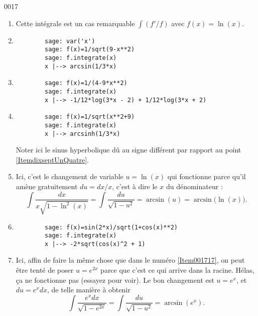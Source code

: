 \begin{corrige}{0017}
\begin{enumerate}
\item
Cette intégrale est un cas remarquable $\int (f'/f)$ avec $f(x)=\ln(x)$.

\item\label{ItemdixseptUnQuatre}
	
	\begin{verbatim}
		sage: var('x')
		sage: f(x)=1/sqrt(9-x**2)
		sage: f.integrate(x)
		x |--> arcsin(1/3*x)
	\end{verbatim}


\item
	\begin{verbatim}
		sage: f(x)=1/(4-9*x**2)
		sage: f.integrate(x)   
		x |--> -1/12*log(3*x - 2) + 1/12*log(3*x + 2)
	\end{verbatim}
\item

	\begin{verbatim}
		sage: f(x)=1/sqrt(x**2+9)
		sage: f.integrate(x)     
		x |--> arcsinh(1/3*x)
	\end{verbatim}
	Noter ici le sinus hyperbolique dû au signe différent par rapport au point \ref{ItemdixseptUnQuatre}.
\item\label{Item001717}
Ici, c'est le changement de variable $u=\ln(x)$ qui fonctionne parce qu'il amène gratuitement $du=dx/x$, c'est à dire le $x$ du dénominateur :
\begin{equation}
	\int\frac{ dx }{ x\sqrt{1-\ln^2(x)} }=\int\frac{ du }{ \sqrt{1-u^2} }=\arcsin(u)=\arcsin\big( \ln(x) \big).
\end{equation}

\item

	\begin{verbatim}
		sage: f(x)=sin(2*x)/sqrt(1+cos(x)**2)
		sage: f.integrate(x)                 
		x |--> -2*sqrt(cos(x)^2 + 1)
	\end{verbatim}
	

\item
Ici, affin de faire la même chose que dans le numéro \ref{Item001717}, on peut être tenté de poser $u= e^{2x}$ parce que c'est ce qui arrive dans la racine. Hélas, ça ne fonctionne pas (essayez pour voir). Le bon changement est $u=e^x$, et $du= e^{x}dx$, de telle manière à obtenir
\begin{equation}
	\int\frac{  e^{x}dx }{ \sqrt{1- e^{2x}} }=\int\frac{ du }{ \sqrt{1-u^2} }=\arcsin(e^x).
\end{equation}


\end{enumerate}
\end{corrige}
